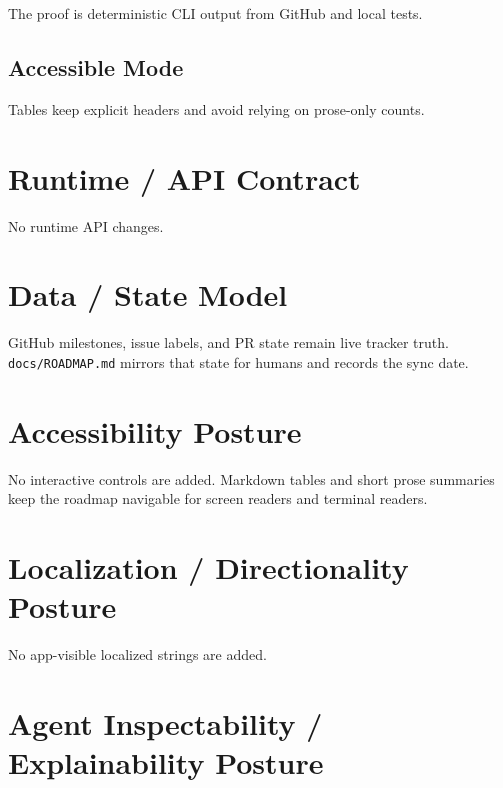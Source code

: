 The proof is deterministic CLI output from GitHub and local tests.

\subsection{Accessible Mode}\label{record-213-accessible-mode}

Tables keep explicit headers and avoid relying on prose-only counts.

\section{Runtime / API Contract}\label{record-213-runtime-api-contract}

No runtime API changes.

\section{Data / State Model}\label{record-213-data-state-model}

GitHub milestones, issue labels, and PR state remain live tracker truth. \texttt{d\allowbreak{}o\allowbreak{}c\allowbreak{}s\allowbreak{}/\allowbreak{}R\allowbreak{}O\allowbreak{}A\allowbreak{}D\allowbreak{}M\allowbreak{}A\allowbreak{}P\allowbreak{}.\allowbreak{}m\allowbreak{}d} mirrors that state for humans and records the sync date.

\section{Accessibility Posture}\label{record-213-accessibility-posture}

No interactive controls are added. Markdown tables and short prose summaries keep the roadmap navigable for screen readers and terminal readers.

\section{Localization / Directionality Posture}\label{record-213-localization-directionality-posture}

No app-visible localized strings are added.

\section{Agent Inspectability / Explainability Posture}\label{record-213-agent-inspectability-explainability-posture}

